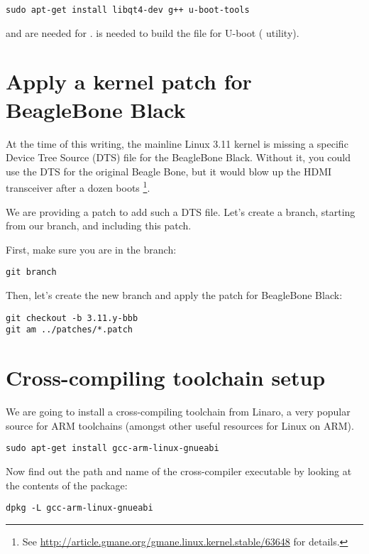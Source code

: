 \begin{verbatim}
sudo apt-get install libqt4-dev g++ u-boot-tools
\end{verbatim}

 and  are needed for .
 is needed to build the  file for
U-boot ( utility).

\section{Apply a kernel patch for BeagleBone Black}

At the time of this writing, the mainline Linux 3.11 kernel is missing a 
specific Device Tree Source (DTS) file for the BeagleBone Black.
Without it, you could use the DTS for the original Beagle Bone, but it
would blow up the HDMI transceiver after a dozen boots \footnote{See
\url{http://article.gmane.org/gmane.linux.kernel.stable/63648} for
details.}. 

We are providing a patch to add such a DTS file. Let's create 
a branch, starting from our  branch, and including this
patch.

First, make sure you are in the  branch:
\begin{verbatim}
git branch
\end{verbatim}

Then, let's create the new branch and apply the patch for BeagleBone
Black:
\begin{verbatim}
git checkout -b 3.11.y-bbb
git am ../patches/*.patch
\end{verbatim}
 
\section{Cross-compiling toolchain setup}

We are going to install a cross-compiling toolchain from Linaro, a
very popular source for ARM toolchains (amongst other useful resources
for Linux on ARM).

\begin{verbatim}
sudo apt-get install gcc-arm-linux-gnueabi
\end{verbatim}

Now find out the path and name of the cross-compiler executable by looking at the contents of the package:

\begin{verbatim}
dpkg -L gcc-arm-linux-gnueabi
\end{verbatim}


